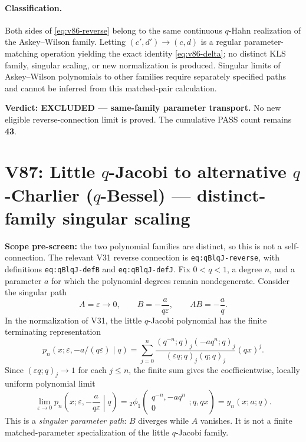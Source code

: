 \documentclass[11pt]{article}
\begin{document}
\paragraph{Classification.}
Both sides of \eqref{eq:v86-reverse} belong to the same continuous $q$-Hahn realization of the Askey--Wilson family. Letting $(c',d')\to(c,d)$ is a regular parameter-matching operation yielding the exact identity \eqref{eq:v86-delta}; no distinct KLS family, singular scaling, or new normalization is produced. Singular limits of Askey--Wilson polynomials to other families require separately specified paths and cannot be inferred from this matched-pair calculation.

\noindent\textbf{Verdict: EXCLUDED --- same-family parameter transport.} No new eligible reverse-connection limit is proved. The cumulative PASS count remains \textbf{43}.


\section{V87: Little $q$-Jacobi to alternative $q$-Charlier ($q$-Bessel) --- distinct-family singular scaling}
\noindent\textbf{Scope pre-screen:} the two polynomial families are distinct, so this is not a self-connection. The relevant V31 reverse connection is \texttt{eq:qBlqJ-reverse}, with definitions \texttt{eq:qBlqJ-defB} and \texttt{eq:qBlqJ-defJ}. Fix $0<q<1$, a degree $n$, and a parameter $a$ for which the polynomial degrees remain nondegenerate. Consider the singular path
\[
 A=\varepsilon\longrightarrow0,\qquad B=-\frac{a}{q\varepsilon},\qquad AB=-\frac aq.
\]
In the normalization of V31, the little $q$-Jacobi polynomial has the finite terminating representation
\begin{equation}\label{eq:v87-p}
 p_n(x;\varepsilon,-a/(q\varepsilon)\mid q)
 =\sum_{j=0}^n\frac{(q^{-n};q)_j(-aq^n;q)_j}{(\varepsilon q;q)_j(q;q)_j}(qx)^j.
\end{equation}
Since $(\varepsilon q;q)_j\to1$ for each $j\le n$, the finite sum gives the coefficientwise, locally uniform polynomial limit
\begin{equation}\label{eq:v87-limit}
 \boxed{\displaystyle\lim_{\varepsilon\to0}
 p_n\left(x;\varepsilon,-\frac{a}{q\varepsilon}\middle|q\right)
 ={}_2\phi_1\!\left(\begin{matrix}q^{-n},-aq^n\\0\end{matrix};q,qx\right)
 =y_n(x;a;q).}
\end{equation}
This is a \emph{singular parameter path}: $B$ diverges while $A$ vanishes. It is not a finite matched-parameter specialization of the little $q$-Jacobi family.
\end{document}
